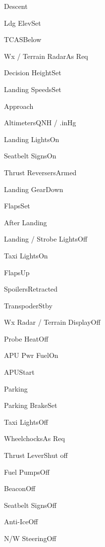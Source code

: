 \documentclass[sim-use]{checklist}
\begin{document}
\begin{checklist}{Descent}
    \item{Ldg Elev}{Set}
    \item{TCAS}{Below}
    \item{Wx / Terrain Radar}{As Req}
    \item{Decision Height}{Set}
    \item{Landing Speeds}{Set}
\end{checklist}

\begin{checklist}{Approach}
    \item{Altimeters}{\blank QNH / \blank.\blank inHg}
    \item{Landing Lights}{On}
    \item{Seatbelt Signs}{On}
    \item{Thrust Reversers}{Armed}
    \item{Landing Gear}{Down}
    \item{Flaps}{Set}
\end{checklist}

\begin{checklist}{After Landing}
    \item{Landing / Strobe Lights}{Off}
    \item{Taxi Lights}{On}
    \item{Flaps}{Up}
    \item{Spoilers}{Retracted}
    \item{Transpoder}{Stby}
    \item{Wx Radar / Terrain Display}{Off}
    \item{Probe Heat}{Off}
    \item{APU Pwr Fuel}{On}
    \item{APU}{Start}
\end{checklist}

\begin{checklist}{Parking}
    \item{Parking Brake}{Set}
    \item{Taxi Lights}{Off}
    \item{Wheelchocks}{As Req}
    \item{Thrust Lever}{Shut off}
    \item{Fuel Pumps}{Off}
    \item{Beacon}{Off}
    \item{Seatbelt Signs}{Off}
    \item{Anti-Ice}{Off}
    \item{N/W Steering}{Off}
\end{checklist}
\end{document}
